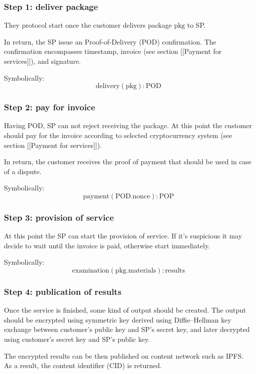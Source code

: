 \documentclass{article}
\begin{document}
\subsubsection{Step 1: deliver package}

They protocol start once the customer delivers package $\mathrm{pkg}$ to SP.

In return, the SP issue an Proof-of-Delivery (POD) confirmation. The confirmation encompasses timestamp, invoice (see section [[Payment for services]]), and signature. 

Symbolically:
$$
\mathrm{delivery}(\mathrm{pkg}) : \mathrm{POD}
$$


\subsubsection{Step 2: pay for invoice}
Having POD, SP can not reject receiving the package. At this point the customer should pay for the invoice according to selected cryptocurrency system (see section [[Payment for services]]). 

In return, the customer receives the proof of payment that should be used in case of a dispute.

Symbolically:
$$
\mathrm{payment}(\mathrm{POD}.\mathrm{nonce}) : \mathrm{POP}
$$

\subsubsection{Step 3: provision of service}
At this point the SP can start the provision of service. If it's suspicious it may decide to wait until the invoice is paid, otherwise start immediately.

Symbolically:
$$
\mathrm{examination}(\mathrm{pkg}.\mathrm{materials}) : \mathrm{results}
$$

\subsubsection{Step 4: publication of results}
Once the service is finished, some kind of output should be created. The output should be encrypted using symmetric key derived using Diffie–Hellman key exchange between customer's public key and SP's secret key, and later decrypted using customer's secret key and SP's public key. 

The encrypted results can be then published on content network such as IPFS. As a result, the content identifier (CID) is returned.
\end{document}
